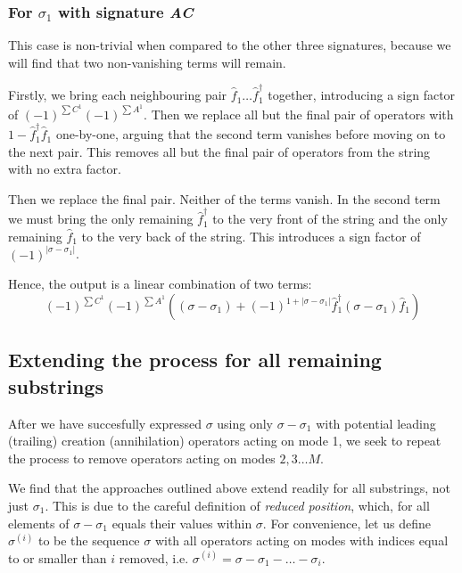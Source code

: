 \documentclass[12pt]{article}
\newcommand{\hc}{^\dagger}
\begin{document}
	\subsubsection{For $\sigma_1$ with signature \textit{AC}}
	This case is non-trivial when compared to the other three signatures, because we will find that two non-vanishing terms will remain.
	
	Firstly, we bring each neighbouring pair $\hat{f}_1 \dots \hat{f}_1\hc$ together, introducing a sign factor of $(-1)^{\sum C^1}(-1)^{\sum A^1}$. Then we replace all but the final pair of operators with $1-\hat{f}_1\hc \hat{f}_1$ one-by-one, arguing that the second term vanishes before moving on to the next pair. This removes all but the final pair of operators from the string with no extra factor.
	
	Then we replace the final pair. Neither of the terms vanish. In the second term we must bring the only remaining $\hat{f}_1\hc$ to the very front of the string and the only remaining $\hat{f}_1$ to the very back of the string. This introduces a sign factor of $(-1)^{|\sigma - \sigma_1|}$.
	
	Hence, the output is a linear combination of two terms:
	$$(-1)^{\sum C^1}(-1)^{\sum A^1} \left( (\sigma - \sigma_1) + (-1)^{1+|\sigma - \sigma_1|} \hat{f}_1\hc (\sigma - \sigma_1) \hat{f}_1 \right)$$
	
	\subsection{Extending the process for all remaining substrings}
	
	After we have succesfully expressed $\sigma$ using only $\sigma - \sigma_1$ with potential leading (trailing) creation (annihilation) operators acting on mode 1, we seek to repeat the process to remove operators acting on modes $2, 3 \dots M$.
	
	We find that the approaches outlined above extend readily for all substrings, not just $\sigma_1$. This is due to the careful definition of \textit{reduced position}, which, for all elements of $\sigma - \sigma_1$ equals their values within $\sigma$. For convenience, let us define $\sigma^{(i)}$ to be the sequence $\sigma$ with all operators acting on modes with indices equal to or smaller than $i$ removed, i.e. $\sigma^{(i)} = \sigma - \sigma_1 - \dots - \sigma_i$.
	
\end{document}
